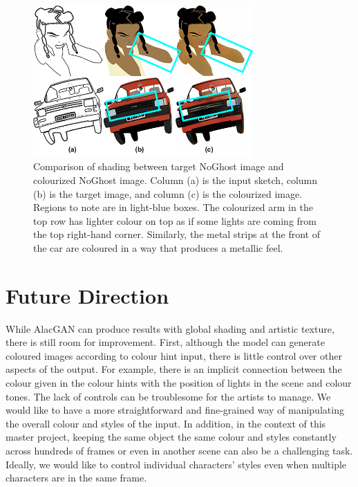 \begin{figure}
    \centering
    \includegraphics[width=0.75\textwidth]{images/colorization/shading-compare.png}
    \caption[Comparison of shading between target NoGhost image and colourized NoGhost image.]{Comparison of shading between target NoGhost image and colourized NoGhost image. Column (a) is the input sketch, column (b) is the target image, and column (c) is the colourized image. Regions to note are in light-blue boxes. The colourized arm in the top row has lighter colour on top as if some lights are coming from the top right-hand corner. Similarly, the metal strips at the front of the car are coloured in a way that produces a metallic feel.}
    \label{fig:shading-compare}
\end{figure}


\section{Future Direction}
While AlacGAN can produce results with global shading and artistic texture, there is still room for improvement. First, although the model can generate coloured images according to colour hint input, there is little control over other aspects of the output. For example, there is an implicit connection between the colour given in the colour hints with the position of lights in the scene and colour tones. The lack of controls can be troublesome for the artists to manage. We would like to have a more straightforward and fine-grained way of manipulating the overall colour and styles of the input. In addition, in the context of this master project, keeping the same object the same colour and styles constantly across hundreds of frames or even in another scene can also be a challenging task. Ideally, we would like to control individual characters' styles even when multiple characters are in the same frame.


